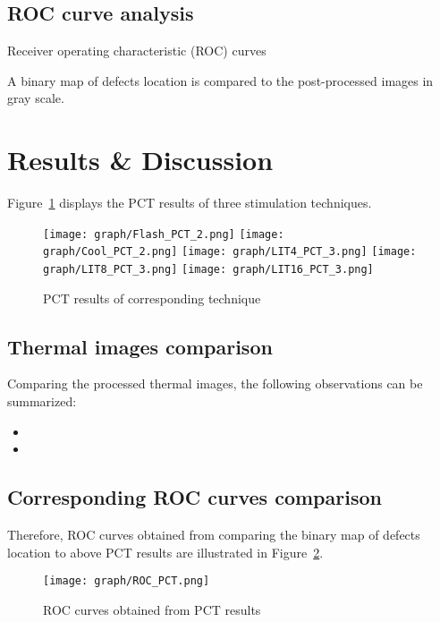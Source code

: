 \documentclass[]{spie}  %
\begin{document}
\subsection{ROC curve analysis} %
\label{sub:roc_curve_analysis}
Receiver operating characteristic (ROC) curves

A binary map of defects location is compared to the post-processed images in gray scale.


\section{Results \& Discussion} %
\label{sec:results_&_discussion}
Figure~\ref{PCT_result} displays the PCT results of three stimulation techniques.
\begin{figure}[ht]
    \centering
    \texttt{[image: graph/Flash\_PCT\_2.png]}
    \texttt{[image: graph/Cool\_PCT\_2.png]}
    \texttt{[image: graph/LIT4\_PCT\_3.png]}
    \texttt{[image: graph/LIT8\_PCT\_3.png]}
    \texttt{[image: graph/LIT16\_PCT\_3.png]}
    \caption{PCT results of corresponding technique}
    \label{PCT_result}
\end{figure}

\subsection{Thermal images comparison} 
Comparing the processed thermal images, the following observations can be summarized:  
\begin{itemize}
    \item 
    \item 
\end{itemize}

\subsection{Corresponding ROC curves comparison}
Therefore, ROC curves obtained from comparing the binary map of defects location to above PCT results are illustrated in Figure~\ref{ROC_curve}.
\begin{figure}[ht]
    \centering
    \texttt{[image: graph/ROC\_PCT.png]}
    \caption{ROC curves obtained from PCT results}
    \label{ROC_curve}
\end{figure}


\end{document}
